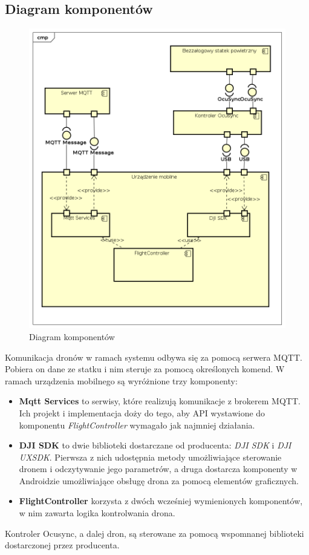 \subsection{Diagram komponentów}
\begin{figure}[!htp]
  \centering
  \includegraphics[width=14cm]{./Obrazy/Component Diagram0.png}
  \caption{Diagram komponentów}
  \end{figure}
Komunikacja dronów w ramach systemu odbywa się za pomocą serwera MQTT. Pobiera on dane ze statku i nim steruje za pomocą określonych komend. W ramach urządzenia mobilnego są wyróżnione trzy komponenty:
  \begin{itemize}
  \item \textbf{Mqtt Services} to serwisy, które realizują komunikacje z brokerem MQTT. Ich projekt i implementacja doży do tego, aby API wystawione do komponentu \textit{FlightController} wymagało jak najmniej działania.
  \item \textbf{DJI SDK} to dwie biblioteki dostarczane od producenta: \textit{DJI SDK} i \textit{DJI UXSDK}. Pierwsza z nich udostępnia metody umożliwiające sterowanie dronem i odczytywanie jego parametrów, a druga dostarcza komponenty w Androidzie umożliwiające obsługę drona za pomocą elementów graficznych.
  \item \textbf{FlightController} korzysta z dwóch wcześniej wymienionych komponentów, w nim zawarta logika kontrolwania drona.
  \end{itemize}
Kontroler Ocusync, a dalej dron, są sterowane za pomocą wspomnanej biblioteki dostarczonej przez producenta.

